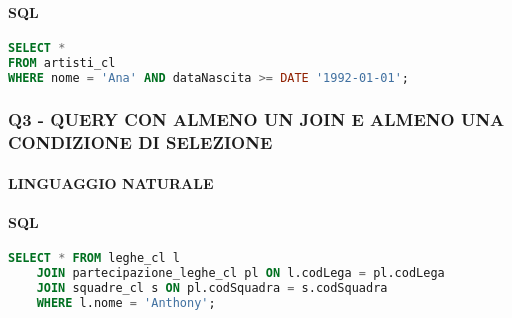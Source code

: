 \documentclass[a4paper]{article}
\begin{document}

\paragraph*{SQL \\}

\begin{lstlisting}[language=SQL]
SELECT *
FROM artisti_cl
WHERE nome = 'Ana' AND dataNascita >= DATE '1992-01-01';
\end{lstlisting}


\subsubsection{Q3 - QUERY CON ALMENO UN JOIN E ALMENO UNA CONDIZIONE DI SELEZIONE\\ }

\paragraph*{LINGUAGGIO NATURALE\\}


\paragraph*{SQL \\}

\begin{lstlisting}[language=SQL]
	SELECT * FROM leghe_cl l
	JOIN partecipazione_leghe_cl pl ON l.codLega = pl.codLega
	JOIN squadre_cl s ON pl.codSquadra = s.codSquadra
	WHERE l.nome = 'Anthony';
\end{lstlisting}
\end{document}

